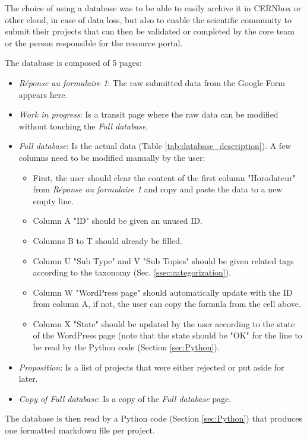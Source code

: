 The choice of using a database was to be able to easily archive it in CERNbox or other cloud, in case of data loss, but also to enable the scientific community to submit their projects that can then be validated or completed by the core team or the person responsible for the resource portal.

The database is composed of 5 pages:
\begin{itemize}
    \item \textit{Réponse au formulaire 1}: The raw submitted data from the Google Form appears here.
    \item \textit{Work in progress}: Is a transit page where the raw data can be modified without touching the \textit{Full database}.
    \item \textit{Full database}: Is the actual data (Table \ref{tab:database_description}). A few columns need to be modified manually by the user: 
    \begin{itemize}
        \item First, the user should clear the content of the first column "Horodateur" from \textit{Réponse au formulaire 1} and copy and paste the data to a new empty line.
        \item Column A "ID" should be given an unused ID.
        \item Columns B to T should already be filled.
        \item Column U "Sub Type" and V "Sub Topics" should be given related tags according to the taxonomy (Sec. \ref{ssec:categorization}).
        \item Column W "WordPress page" should automatically update with the ID from column A, if not, the user can copy the formula from the cell above.
        \item Column X "State" should be updated by the user according to the state of the WordPress page (note that the state should be "OK" for the line to be read by the Python code (Section \ref{sec:Python}).
    \end{itemize}
    \item \textit{Proposition}: Is a list of projects that were either rejected or put aside for later.
    \item \textit{Copy of Full database}: Is a copy of the \textit{Full database} page.
\end{itemize}

The database is then read by a Python code (Section \ref{sec:Python}) that produces one formatted markdown file per project.

